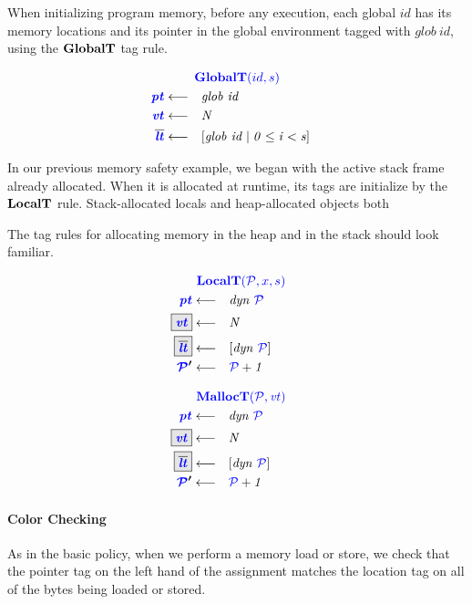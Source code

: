 \documentclass{llncs}
\begin{document}
When initializing program memory, before any execution, each global \(id\) has its
memory locations and its pointer in the global environment tagged with \(\mathit{glob} ~ id\),
using the \(\mathbf{GlobalT}\) tag rule.

\[\begin{aligned}
\truledef{\globalt}
\settag{\pt}{\mathit{glob ~ id}}
\settag{\vt}{N}
\settag{\overline{\lt}}{\left[\mathit{glob} ~ id \mid 0 \leq i < s\right]}
\end{aligned}\]

In our previous memory safety example, we began with the active stack frame already allocated.
When it is allocated at runtime, its tags are initialize by the \(\mathbf{LocalT}\) rule.
Stack-allocated locals and heap-allocated objects both

The tag rules for allocating memory in the heap and in the stack should look familiar.

\begin{minipage}{0.49\textwidth}
\[\begin{aligned}
\truledef{\localt}
\settag{\pt}{dyn ~ \PCT}
\settagopt{\vt}{N}
\settagopt{\overline{\lt}}{\left[dyn ~ \PCT\right]}
\settag{\PCT'}{\PCT+1}
\end{aligned}\]
\end{minipage}
\begin{minipage}{0.49\textwidth}
\[\begin{aligned}
\truledef{\malloct}
\settag{\pt}{dyn ~ \PCT}
\settagopt{\vt}{N}
\settagopt{\overline{\lt}}{\left[dyn ~ \PCT\right]}
\settag{\PCT'}{\PCT + 1}
\end{aligned}\]
\end{minipage}

\paragraph*{Color Checking}

As in the basic policy, when we perform a memory load or store, we check that the pointer tag
on the left hand of the assignment matches the location tag on all of the bytes being loaded or stored.

\begin{minipage}{0.49\textwidth}
\end{minipage}
\begin{minipage}{0.49\textwidth}
\end{minipage}
\end{document}
